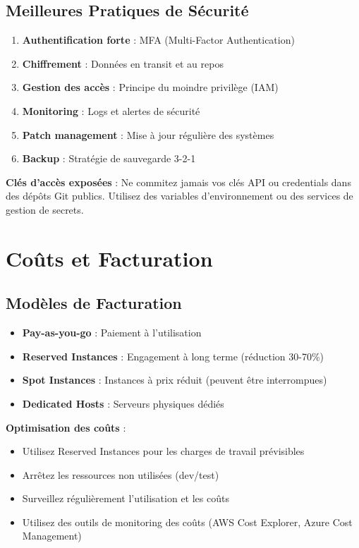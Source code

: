 \documentclass[11pt,a4paper]{article}
\begin{document}
\subsection{Meilleures Pratiques de Sécurité}

\begin{enumerate}
    \item \textbf{Authentification forte} : MFA (Multi-Factor Authentication)
    \item \textbf{Chiffrement} : Données en transit et au repos
    \item \textbf{Gestion des accès} : Principe du moindre privilège (IAM)
    \item \textbf{Monitoring} : Logs et alertes de sécurité
    \item \textbf{Patch management} : Mise à jour régulière des systèmes
    \item \textbf{Backup} : Stratégie de sauvegarde 3-2-1
\end{enumerate}

\begin{dangerbox}
\textbf{Clés d'accès exposées} : Ne commitez jamais vos clés API ou credentials dans des dépôts Git publics. Utilisez des variables d'environnement ou des services de gestion de secrets.
\end{dangerbox}

\section{Coûts et Facturation}

\subsection{Modèles de Facturation}

\begin{itemize}
    \item \textbf{Pay-as-you-go} : Paiement à l'utilisation
    \item \textbf{Reserved Instances} : Engagement à long terme (réduction 30-70\%)
    \item \textbf{Spot Instances} : Instances à prix réduit (peuvent être interrompues)
    \item \textbf{Dedicated Hosts} : Serveurs physiques dédiés
\end{itemize}

\begin{tipbox}
\textbf{Optimisation des coûts} : 
\begin{itemize}
    \item Utilisez Reserved Instances pour les charges de travail prévisibles
    \item Arrêtez les ressources non utilisées (dev/test)
    \item Surveillez régulièrement l'utilisation et les coûts
    \item Utilisez des outils de monitoring des coûts (AWS Cost Explorer, Azure Cost Management)
\end{itemize}
\end{tipbox}
\end{document}
